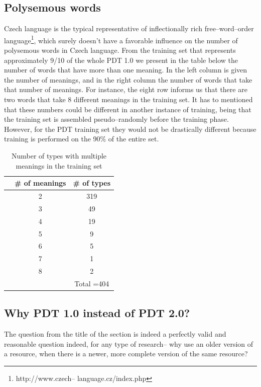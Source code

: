 \subsection{Polysemous words}\label{pdt}
Czech language is the typical representative of inflectionally rich free--word--order language\footnote{http://www.czech--
language.cz/index.php}, which surely doesn't have a favorable influence on the number of polysemous words in Czech 
language. From the training set that represents approximately 9/10 of the whole PDT 1.0 we present in the table below the 
number of words that have more than one meaning. In the left column is given the number of meanings, and in the right column 
the number of words that take that number of meanings. For instance, the eight row informs us that there are two words that 
take 8 different meanings in the training set. It has to mentioned that these numbers could be different in another instance of 
training, being that the training set is assembled pseudo--randomly before the training phase. However, for the PDT training set they would not be drastically different because training is performed on the 90\% of the entire set. 
\begin{table}[h!]
\begin{center}
	\begin{tabular}{ c  c |  c }
   	&   \# of meanings & \# of types \\
\hline  
 & 2 & 319  \\
 & 3 & 49  \\
 & 4 & 19  \\
 & 5 & 9  \\
 & 6 & 5  \\
 & 7 & 1  \\
 & 8 & 2  \\
\hline  
& &Total =404\\  
 	\end{tabular}
\end{center}
\caption{Number of types with multiple meanings in the training set}
\end{table}



\subsection{Why PDT 1.0 instead of PDT 2.0?}
The question from the title of the section is indeed a perfectly valid and reasonable question indeed, for 
any type of research-- why use an older version of a resource, when there is a newer, more complete 
version of the same resource?  

